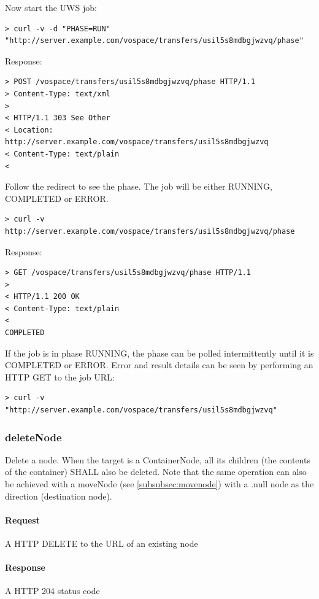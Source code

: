 \documentclass[11pt,a4paper]{ivoa}
\begin{document}
Now start the UWS job:
\begin{lstlisting}
> curl -v -d "PHASE=RUN" "http://server.example.com/vospace/transfers/usil5s8mdbgjwzvq/phase"
\end{lstlisting}
Response:
\begin{lstlisting}
> POST /vospace/transfers/usil5s8mdbgjwzvq/phase HTTP/1.1
> Content-Type: text/xml
>
< HTTP/1.1 303 See Other
< Location: http://server.example.com/vospace/transfers/usil5s8mdbgjwzvq
< Content-Type: text/plain
<
\end{lstlisting}
Follow the redirect to see the phase.  The job will be either RUNNING, COMPLETED or ERROR.
\begin{lstlisting}
> curl -v http://server.example.com/vospace/transfers/usil5s8mdbgjwzvq/phase
\end{lstlisting}
Response:
\begin{lstlisting}
> GET /vospace/transfers/usil5s8mdbgjwzvq/phase HTTP/1.1
>
< HTTP/1.1 200 OK
< Content-Type: text/plain
<
COMPLETED
\end{lstlisting}
If the job is in phase RUNNING, the phase can be polled intermittently until it is COMPLETED or ERROR.
Error and result details can be seen by performing an HTTP GET to the job URL:
\begin{lstlisting}
> curl -v "http://server.example.com/vospace/transfers/usil5s8mdbgjwzvq"
\end{lstlisting}

\subsubsection{deleteNode}
\label{subsubsec:deletenode}
Delete a node.
When the target is a ContainerNode, all its children (the contents of the container) SHALL also be deleted.
Note that the same operation can also be achieved with a moveNode (see \ref{subsubsec:movenode}) with a .null node as the direction (destination node).

\paragraph{Request}
A HTTP DELETE to the URL of an existing node

\paragraph{Response}
A HTTP 204 status code
\end{document}
